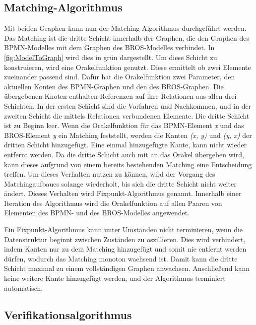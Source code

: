 \pagebreak
\subsection*{Matching-Algorithmus}

Mit beiden Graphen kann nun der Matching-Algorithmus durchgeführt werden.
Das Matching ist die dritte Schicht innerhalb der Graphen, die den Graphen des BPMN-Modelles mit dem Graphen des BROS-Modelles verbindet.
In \cref{fig:ModelToGraph} wird dies in grün dargestellt.
Um diese Schicht zu konstruieren, wird eine Orakelfunktion genutzt.
Diese ermittelt ob zwei Elemente zueinander passend sind.
Dafür hat die Orakelfunktion zwei Parameter, den aktuellen Konten des BPMN-Graphen und den des BROS-Graphen.
Die übergebenen Knoten enthalten Referenzen auf ihre Relationen aus allen drei Schichten.
In der ersten Schicht sind die Vorfahren und Nachkommen, und in der zweiten Schicht die mittels Relationen verbundenen Elemente.
Die dritte Schicht ist zu Beginn leer.
Wenn die Orakelfunktion für das BPMN-Element \emph{x} und das BROS-Element \emph{y} ein Matching feststellt, werden die Kanten \emph{(x, y)} und \emph{(y, x)} der dritten Schicht hinzugefügt.
Eine einmal hinzugefügte Kante, kann nicht wieder entfernt werden.
Da die dritte Schicht auch mit an das Orakel übergeben wird, kann dieses aufgrund von einem bereits bestehenden Matching eine Entscheidung treffen.
Um dieses Verhalten nutzen zu können, wird der Vorgang des Matchingaufbaues solange wiederholt, bis sich die dritte Schicht nicht weiter ändert.
Dieses Verhalten wird Fixpunkt-Algorithmus genannt.
Innerhalb einer Iteration des Algorithmus wird die Orakelfunktion auf allen Paaren von Elementen des BPMN- und des BROS-Modelles angewendet.

Ein Fixpunkt-Algorithmus kann unter Umständen nicht terminieren, wenn die Datenstruktur  beginnt zwischen Zuständen zu oszillieren.
Dies wird verhindert, indem Kanten nur zu dem Matching hinzugefügt und somit nie entfernt werden dürfen, wodurch das Matching monoton wachsend ist.
Damit kann die dritte Schicht maximal zu einem vollständigen Graphen anwachsen.
Anschließend kann keine weitere Kante hinzugefügt werden, und der Algorithmus terminiert automatisch.

\clearpage
\subsection*{Verifikationsalgorithmus}

